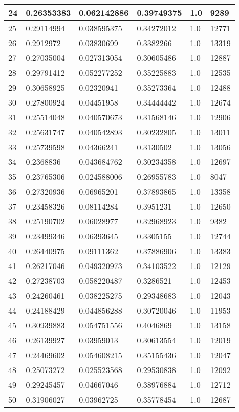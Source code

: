 \begin{longtable}{|l|l|l|l|l|l|}
24 & 0.26353383 & 0.062142886 & 0.39749375 & 1.0 & 9289 \\ \hline 
25 & 0.29114994 & 0.038595375 & 0.34272012 & 1.0 & 12771 \\ \hline 
26 & 0.2912972 & 0.03830699 & 0.3382266 & 1.0 & 13319 \\ \hline 
27 & 0.27035004 & 0.027313054 & 0.30605486 & 1.0 & 12887 \\ \hline 
28 & 0.29791412 & 0.052277252 & 0.35225883 & 1.0 & 12535 \\ \hline 
29 & 0.30658925 & 0.02320941 & 0.35273364 & 1.0 & 12488 \\ \hline 
30 & 0.27800924 & 0.04451958 & 0.34444442 & 1.0 & 12674 \\ \hline 
31 & 0.25514048 & 0.040570673 & 0.31568146 & 1.0 & 12906 \\ \hline 
32 & 0.25631747 & 0.040542893 & 0.30232805 & 1.0 & 13011 \\ \hline 
33 & 0.25739598 & 0.04366241 & 0.3130502 & 1.0 & 13056 \\ \hline 
34 & 0.2368836 & 0.043684762 & 0.30234358 & 1.0 & 12697 \\ \hline 
35 & 0.23765306 & 0.024588006 & 0.26955783 & 1.0 & 8047 \\ \hline 
36 & 0.27320936 & 0.06965201 & 0.37893865 & 1.0 & 13358 \\ \hline 
37 & 0.23458326 & 0.08114284 & 0.3951231 & 1.0 & 12650 \\ \hline 
38 & 0.25190702 & 0.06028977 & 0.32968923 & 1.0 & 9382 \\ \hline 
39 & 0.23499346 & 0.06393645 & 0.3305155 & 1.0 & 12744 \\ \hline 
40 & 0.26440975 & 0.09111362 & 0.37886906 & 1.0 & 13383 \\ \hline 
41 & 0.26217046 & 0.049320973 & 0.34103522 & 1.0 & 12129 \\ \hline 
42 & 0.27238703 & 0.058220487 & 0.3286521 & 1.0 & 12453 \\ \hline 
43 & 0.24260461 & 0.038225275 & 0.29348683 & 1.0 & 12043 \\ \hline 
44 & 0.24188429 & 0.044856288 & 0.30720046 & 1.0 & 11953 \\ \hline 
45 & 0.30939883 & 0.054751556 & 0.4046869 & 1.0 & 13158 \\ \hline 
46 & 0.26139927 & 0.03959013 & 0.30613554 & 1.0 & 12019 \\ \hline 
47 & 0.24469602 & 0.054608215 & 0.35155436 & 1.0 & 12047 \\ \hline 
48 & 0.25073272 & 0.025523568 & 0.29530838 & 1.0 & 12092 \\ \hline 
49 & 0.29245457 & 0.04667046 & 0.38976884 & 1.0 & 12712 \\ \hline 
50 & 0.31906027 & 0.03962725 & 0.35778454 & 1.0 & 12687 \\ \hline 
\end{longtable}